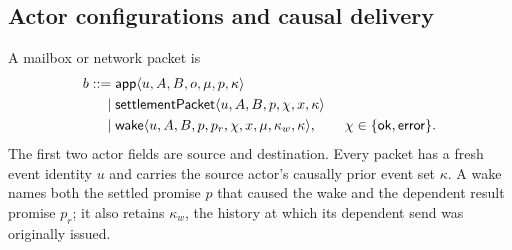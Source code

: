 \subsection{Actor configurations and causal delivery}

A mailbox or network packet is
\begin{equation}\label{eq:packet-grammar}
\begin{split}
 b::={}&\mathsf{app}\langle u,A,B,o,\mu,p,\kappa\rangle\\
  \mid{}&\mathsf{settlementPacket}\langle u,A,B,p,\chi,x,\kappa\rangle\\
  \mid{}&\mathsf{wake}\langle u,A,B,p,p_r,\chi,x,\mu,\kappa_w,\kappa\rangle,
 \qquad \chi\in\{\mathsf{ok},\mathsf{error}\}.
\end{split}
\end{equation}
The first two actor fields are source and destination.  Every packet has a
fresh event identity $u$ and carries the source actor's causally prior event
set $\kappa$.  A wake names both the settled promise $p$ that caused the wake
and the dependent result promise $p_r$; it also retains $\kappa_w$, the
history at which its dependent send was originally issued.

